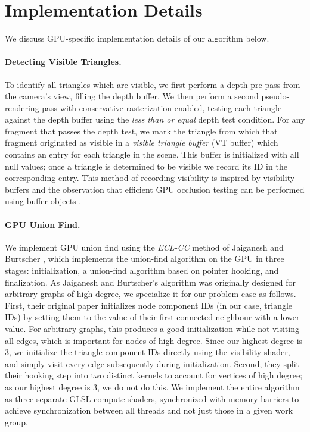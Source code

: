 \section{Implementation Details}
\label{app:implementation_details}

We discuss GPU-specific implementation details of our algorithm below.

\paragraph*{Detecting Visible Triangles.} To identify all triangles which are visible, we first perform a depth pre-pass from the camera's view, filling the depth buffer. We then perform a second pseudo-rendering pass with conservative rasterization enabled, testing each triangle against the depth buffer using the {\em less than or equal} depth test condition. For any fragment that passes the depth test, we mark the triangle from which that fragment originated as visible in a {\em visible triangle buffer} (VT buffer) which contains an entry for each triangle in the scene. This buffer is initialized with all null values; once a triangle is determined to be visible we record its ID in the corresponding entry. This method of recording visibility is inspired by visibility buffers \cite{burns2013visibility} and the observation that efficient GPU occlusion testing can be performed using buffer objects \cite{kubisch2014opengl}.  

\paragraph*{GPU Union Find.} We implement GPU union find using the {\em ECL-CC} method of Jaiganesh and Burtscher , which implements the union-find algorithm on the GPU in three stages: initialization, a union-find algorithm based on pointer hooking, and finalization. As Jaiganesh and Burtscher's algorithm was originally designed for arbitrary graphs of high degree, we specialize it for our problem case as follows. First, their original paper initializes node component IDs (in our case, triangle IDs) by setting them to the value of their first connected neighbour with a lower value. For arbitrary graphs, this produces a good initialization while not visiting all edges, which is important for nodes of high degree. Since our highest degree is 3, we initialize the triangle component IDs directly using the visibility shader, and simply visit every edge subsequently during initialization. Second, they split their hooking step into two distinct kernels to account for vertices of high degree; as our highest degree is 3, we do not do this. We implement the entire algorithm as three separate GLSL compute shaders, synchronized with memory barriers to achieve synchronization between all threads and not just those in a given work group.


